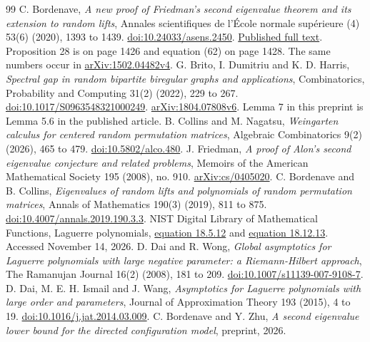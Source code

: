 \documentclass[11pt]{article}
\theoremstyle{definition}
\theoremstyle{remark}
\newcommand{\1}{\mathbf 1}
\begin{document}
\clearpage
\begin{thebibliography}{99}
C. Bordenave, \emph{A new proof of Friedman's second eigenvalue theorem and its extension to random lifts}, Annales scientifiques de l'\'Ecole normale sup\'erieure (4) 53(6) (2020), 1393 to 1439.
\href{https://doi.org/10.24033/asens.2450}{doi:10.24033/asens.2450}.
\href{https://smf.emath.fr/download/pdf/1498332}{Published full text}. Proposition 28 is on page 1426 and equation (62) on page 1428. The same numbers occur in \href{https://arxiv.org/abs/1502.04482v4}{arXiv:1502.04482v4}.
G. Brito, I. Dumitriu and K. D. Harris, \emph{Spectral gap in random bipartite biregular graphs and applications}, Combinatorics, Probability and Computing 31(2) (2022), 229 to 267.
\href{https://doi.org/10.1017/S0963548321000249}{doi:10.1017/S0963548321000249}.
\href{https://arxiv.org/abs/1804.07808v6}{arXiv:1804.07808v6}. Lemma 7 in this preprint is Lemma 5.6 in the published article.
B. Collins and M. Nagatsu, \emph{Weingarten calculus for centered random permutation matrices}, Algebraic Combinatorics 9(2) (2026), 465 to 479.
\href{https://doi.org/10.5802/alco.480}{doi:10.5802/alco.480}.
J. Friedman, \emph{A proof of Alon's second eigenvalue conjecture and related problems}, Memoirs of the American Mathematical Society 195 (2008), no. 910.
\href{https://arxiv.org/abs/cs/0405020}{arXiv:cs/0405020}.
C. Bordenave and B. Collins, \emph{Eigenvalues of random lifts and polynomials of random permutation matrices}, Annals of Mathematics 190(3) (2019), 811 to 875.
\href{https://doi.org/10.4007/annals.2019.190.3.3}{doi:10.4007/annals.2019.190.3.3}.
NIST Digital Library of Mathematical Functions, Laguerre polynomials,
\href{https://dlmf.nist.gov/18.5.E12}{equation 18.5.12} and
\href{https://dlmf.nist.gov/18.12.E13}{equation 18.12.13}. Accessed November 14, 2026.
D. Dai and R. Wong, \emph{Global asymptotics for Laguerre polynomials with large negative parameter: a Riemann-Hilbert approach}, The Ramanujan Journal 16(2) (2008), 181 to 209.
\href{https://doi.org/10.1007/s11139-007-9108-7}{doi:10.1007/s11139-007-9108-7}.
D. Dai, M. E. H. Ismail and J. Wang, \emph{Asymptotics for Laguerre polynomials with large order and parameters}, Journal of Approximation Theory 193 (2015), 4 to 19.
\href{https://doi.org/10.1016/j.jat.2014.03.009}{doi:10.1016/j.jat.2014.03.009}.
C. Bordenave and Y. Zhu, \emph{A second eigenvalue lower bound for the directed configuration model}, preprint, 2026.

\end{thebibliography}
\end{document}
